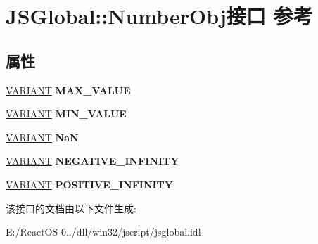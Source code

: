 \hypertarget{interface_j_s_global_1_1_number_obj}{}\section{J\+S\+Global\+:\+:Number\+Obj接口 参考}
\label{interface_j_s_global_1_1_number_obj}
\subsection*{属性}
\begin{DoxyCompactItemize}
\item 
\mbox{\label{interface_j_s_global_1_1_number_obj_a7e0e6bf7247738319954b82a730df2ac}} 
\hyperlink{structtag_v_a_r_i_a_n_t}{V\+A\+R\+I\+A\+NT} {\bfseries M\+A\+X\+\_\+\+V\+A\+L\+UE}
\item 
\mbox{\label{interface_j_s_global_1_1_number_obj_a669478d4b40261f32572566182441bec}} 
\hyperlink{structtag_v_a_r_i_a_n_t}{V\+A\+R\+I\+A\+NT} {\bfseries M\+I\+N\+\_\+\+V\+A\+L\+UE}
\item 
\mbox{\label{interface_j_s_global_1_1_number_obj_a91ae85df62b0d57e8ee2d41cc85797e1}} 
\hyperlink{structtag_v_a_r_i_a_n_t}{V\+A\+R\+I\+A\+NT} {\bfseries NaN}
\item 
\mbox{\label{interface_j_s_global_1_1_number_obj_a72ff806402ccb29730c1e3ea9c56e48d}} 
\hyperlink{structtag_v_a_r_i_a_n_t}{V\+A\+R\+I\+A\+NT} {\bfseries N\+E\+G\+A\+T\+I\+V\+E\+\_\+\+I\+N\+F\+I\+N\+I\+TY}
\item 
\mbox{\label{interface_j_s_global_1_1_number_obj_a89f65ff8b0ea4660eee373563d97d5af}} 
\hyperlink{structtag_v_a_r_i_a_n_t}{V\+A\+R\+I\+A\+NT} {\bfseries P\+O\+S\+I\+T\+I\+V\+E\+\_\+\+I\+N\+F\+I\+N\+I\+TY}
\end{DoxyCompactItemize}


该接口的文档由以下文件生成\+:\begin{DoxyCompactItemize}
\item 
E\+:/\+React\+O\+S-\/0../dll/win32/jscript/jsglobal.\+idl\end{DoxyCompactItemize}
